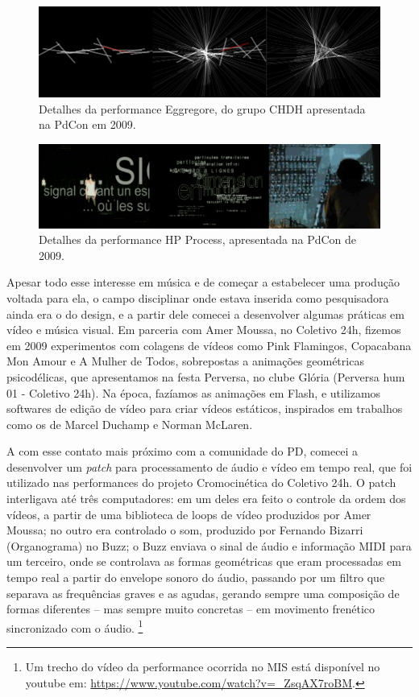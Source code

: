 \begin{figure}

\includegraphics[width=1\textwidth]{pictures/cap1/CHDH}
\caption{Detalhes da performance Eggregore, do grupo CHDH apresentada na PdCon em 2009.}
\label{fig:chdh}
\end{figure}

\begin{figure}

\includegraphics[width=1\textwidth]{pictures/cap1/hp1}
\caption{Detalhes da performance HP Process, apresentada na PdCon de 2009.}
\label{fig:hp}
\end{figure}

Apesar todo esse interesse em música e de começar a estabelecer uma produção voltada para ela, o campo disciplinar onde estava inserida como pesquisadora ainda era o do design, e a partir dele comecei a desenvolver algumas práticas em vídeo e música visual. Em parceria com Amer Moussa, no Coletivo 24h, fizemos em 2009 experimentos com colagens de vídeos como Pink Flamingos, Copacabana Mon Amour e A Mulher de Todos, sobrepostas a animações geométricas psicodélicas, que apresentamos na festa Perversa, no clube Glória (Perversa hum 01 - Coletivo 24h). Na época, fazíamos as animações em Flash, e utilizamos softwares de edição de vídeo para criar vídeos estáticos, inspirados em trabalhos como os de Marcel Duchamp e Norman McLaren. 

A com esse contato mais próximo com a comunidade do PD, comecei a desenvolver um \emph{patch} para processamento de áudio e vídeo em tempo real, que foi utilizado nas performances do projeto Cromocinética do Coletivo 24h. O patch interligava até três computadores: em um deles era feito o controle da ordem dos vídeos, a partir de uma biblioteca de loops de vídeo produzidos por Amer Moussa; no outro era controlado o som, produzido por Fernando Bizarri (Organograma) no Buzz; o Buzz enviava o sinal de áudio e informação MIDI para um terceiro, onde se controlava as formas geométricas que eram processadas em tempo real a partir do envelope sonoro do áudio, passando por um filtro que separava as frequências graves e as agudas, gerando sempre uma composição de formas diferentes – mas sempre muito concretas – em movimento frenético sincronizado com o áudio. \footnote{Um trecho do vídeo da performance ocorrida no MIS está disponível no youtube em:  \url{https://www.youtube.com/watch?v=_ZsqAX7roBM}.}

